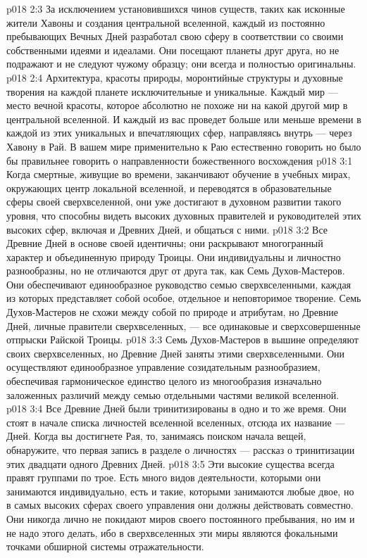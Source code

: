 \vs p018 2:3 За исключением установившихся чинов существ, таких как исконные жители Хавоны и создания центральной вселенной, каждый из постоянно пребывающих Вечных Дней разработал свою сферу в соответствии со своими собственными идеями и идеалами. Они посещают планеты друг друга, но не подражают и не следуют чужому образцу; они всегда и полностью оригинальны.
\vs p018 2:4 Архитектура, красоты природы, моронтийные структуры и духовные творения на каждой планете исключительные и уникальные. Каждый мир --- место вечной красоты, которое абсолютно не похоже ни на какой другой мир в центральной вселенной. И каждый из вас проведет больше или меньше времени в каждой из этих уникальных и впечатляющих сфер, направляясь внутрь --- через Хавону в Рай. В вашем мире применительно к Раю естественно говорить  но было бы правильнее говорить о направленности божественного восхождения 
\vs p018 3:1 Когда смертные, живущие во времени, заканчивают обучение в учебных мирах, окружающих центр локальной вселенной, и переводятся в образовательные сферы своей сверхвселенной, они уже достигают в духовном развитии такого уровня, что способны видеть высоких духовных правителей и руководителей этих высоких сфер, включая и Древних Дней, и общаться с ними.
\vs p018 3:2 Все Древние Дней в основе своей идентичны; они раскрывают многогранный характер и объединенную природу Троицы. Они индивидуальны и личностно разнообразны, но не отличаются друг от друга так, как Семь Духов\hyp{}Мастеров. Они обеспечивают единообразное руководство семью сверхвселенными, каждая из которых представляет собой особое, отдельное и неповторимое творение. Семь Духов\hyp{}Мастеров не схожи между собой по природе и атрибутам, но Древние Дней, личные правители сверхвселенных, --- все одинаковые и сверхсовершенные отпрыски Райской Троицы.
\vs p018 3:3 Семь Духов\hyp{}Мастеров в вышине определяют  своих сверхвселенных, но Древние Дней заняты  этими сверхвселенными. Они осуществляют единообразное управление созидательным разнообразием, обеспечивая гармоническое единство целого из многообразия изначально заложенных различий между семью отдельными частями великой вселенной.
\vs p018 3:4 \pc Все Древние Дней были тринитизированы в одно и то же время. Они стоят в начале списка личностей вселенной вселенных, отсюда их название ---  Дней. Когда вы достигнете Рая, то, занимаясь поиском начала вещей, обнаружите, что первая запись в разделе о личностях --- рассказ о тринитизации этих двадцати одного Древних Дней.
\vs p018 3:5 \pc Эти высокие существа всегда правят группами по трое. Есть много видов деятельности, которыми они занимаются индивидуально, есть и такие, которыми занимаются любые двое, но в самых высоких сферах своего управления они должны действовать совместно. Они никогда лично не покидают миров своего постоянного пребывания, но им и не надо этого делать, ибо в сверхвселенных эти миры являются фокальными точками обширной системы отражательности.
